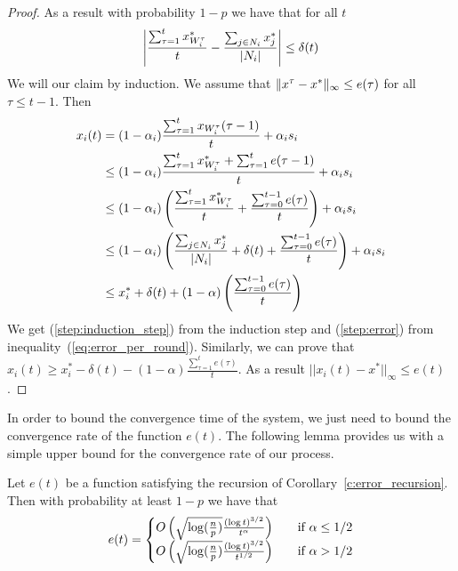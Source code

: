 \begin{proof}
  As a result with probability $1-p$ we have that for all $t$
  \begin{equation}\label{eq:error_per_round}
    \left|
    \frac{\sum_{\tau=1}^t x^*_{W_i^\tau}}{t} -
    \frac{\sum_{j \in N_i} x^*_j}{|N_i|}
    \right| \leq \delta(t)
  \end{equation}
  We will our claim by induction.
  We assume that $\| x^{\tau}-x^* \|_{\infty} \leq e(\tau)$ for all
  $\tau \leq t-1$. Then
  \begin{align}
    x_i(t)
    &=
    (1-\alpha_i)\frac{\sum_{\tau=1}^{t}x_{W_i^{\tau}}(\tau-1)}{t}
    + \alpha_i s_i \nonumber \\
    &\leq
    (1-\alpha_i)\frac{\sum_{\tau=1}^{t}x^*_{W_i^{\tau}} +
      \sum_{\tau=1}^{t} e(\tau-1)}{t} + \alpha_i s_i \label{step:induction_step}\\
    &\leq
    (1-\alpha_i)
    \left(
    \frac{\sum_{\tau=1}^{t}x^*_{W_i^{\tau}}}{t}+
    \frac{\sum_{\tau=0}^{t-1} e(\tau)}{t}
    \right)
    + \alpha_i s_i \nonumber\\
    &\leq
    (1-\alpha_i)\left(\frac{\sum_{j \in N_i}x^*_{j}}{|N_i|} +
    \delta(t) + \frac{\sum_{\tau=0}^{t-1} e(\tau)}{t} \right) +
    \alpha_i s_i \label{step:error} \\
    &\leq
    x_i^* + \delta(t) + (1-\alpha)
    \left(
    \frac{\sum_{\tau=0}^{t-1} e(\tau)}{t}
    \right)
    \nonumber
  \end{align}
  We get (\ref{step:induction_step}) from the induction step and
  (\ref{step:error}) from inequality~(\ref{eq:error_per_round}).
  Similarly, we can prove that
  $x_i(t) \geq x_i^* - \delta(t) - (1-\alpha)
  \frac{\sum_{\tau=1}^t e(\tau)}{t}$.
  As a result $||x_i(t)-x^*||_{\infty} \leq e(t)$.
\end{proof}

In order to bound the convergence time of the system, we just need to bound
the convergence rate of the function $e(t)$.
The following lemma provides us with a simple upper bound for the
convergence rate of our process.
\begin{lemma}\label{l:error_bound}
  Let $e(t)$ be a function satisfying the recursion of
  Corollary~\ref{c:error_recursion}. Then with probability
  at least $1-p$ we have that
  \[
    e(t) =
    \begin{cases}
      O\left(\sqrt{\log(\frac{n}{p})}\frac{(\log t)^{3/2}}{t^\alpha}\right)
      &\quad\text{if } \alpha \leq 1/2\\
      O\left(\sqrt{\log(\frac{n}{p})}\frac{(\log t)^{3/2}}{t^{1/2}}\right)
      &\quad\text{if } \alpha > 1/2\\
    \end{cases}
  \]
\end{lemma}

